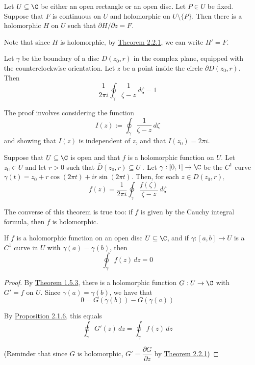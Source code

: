 Let $U\subseteq\C$ be either an open rectangle or an open disc. Let
$P\in U$ be fixed. Suppose that $F$ is continuous on $U$ and
holomorphic on $U\setminus\{P\}$. Then there is a holomorphic $H$ on
$U$ such that $\partial H/\partial z=F$.

Note that since $H$ is holomorphic, by \href{f75e43c}{Theorem 2.2.1},
we can write $H'=F$.

\label{c6c594a}

Let $\gamma$ be the boundary of a disc $D(z_0,r)$ in the complex
plane, equipped with the counterclockwise orientation. Let $z$ be a
point inside the circle $\partial D(z_0,r)$. Then
$$
	\frac1{2\pi i}\oint_\gamma\frac1{\zeta-z}\,d\zeta=1
$$

The proof involves considering the function
$$
	I(z):=\oint_\gamma\frac1{\zeta-z}\,d\zeta
$$
and showing that $I(z)$ is independent of $z$, and that $I(z_0)=2\pi i$.

\label{e50677f}

Suppose that $U\subseteq\C$ is open and that $f$ is a holomorphic
function on $U$. Let $z_0\in U$ and let $r>0$ such that $\bar
	D(z_0,r)\subseteq U$ . Let $\gamma:[0,1]\to\C$ be the $C^1$ curve
$\gamma(t)=z_0+r\cos(2\pi t)+ir\sin(2\pi t)$. Then, for each $z\in
	D(z_0,r)$,
$$
	f(z)=\frac1{2\pi i}\oint_\gamma\frac{f(\zeta)}{\zeta-z}\,d\zeta
$$

The converse of this theorem is true too: if $f$ is given by the
Cauchy integral formula, then $f$ is holomorphic.

\label{fb87a78}

If $f$ is a holomorphic function on an open disc $U\subseteq\C$, and
if $\gamma:[a,b]\to U$ is a $C^1$ curve in $U$ with
$\gamma(a)=\gamma(b)$, then
$$\oint_\gamma f(z)\,dz=0$$

\begin{proof}
	By \href{e7808d1}{Theorem 1.5.3}, there is a holomorphic function
	$G:U\to\C$ with $G'=f$ on $U$. Since $\gamma(a)=\gamma(b)$, we have
	that
	$$
		0=G(\gamma(b))-G(\gamma(a))
	$$

	By \href{c526c09}{Proposition 2.1.6}, this equals
	$$\oint_\gamma G'(z)\,dz=\oint_\gamma f(z)\,dz$$

	(Reminder that since $G$ is holomorphic, $G'=\dfrac{\partial
			G}{\partial z}$ by \href{f75e43c}{Theorem 2.2.1})
\end{proof}

\label{baf22ac}

